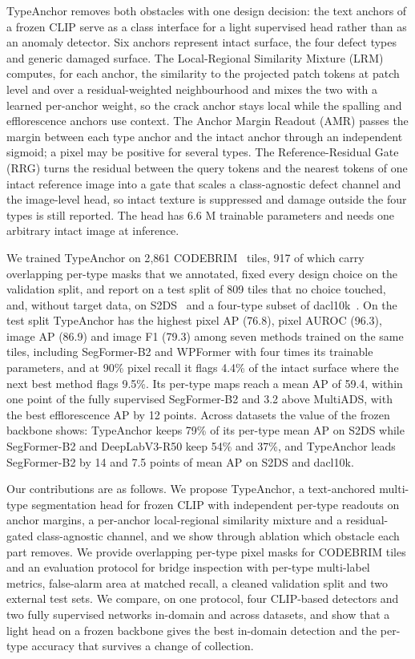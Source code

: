 \documentclass[conference]{IEEEtran}
\newcommand{\ours}{TypeAnchor}
\begin{document}
\ours{} removes both obstacles with one design decision: the text anchors of a frozen CLIP serve as a class interface for a light supervised head rather than as an anomaly detector. Six anchors represent intact surface, the four defect types and generic damaged surface. The Local-Regional Similarity Mixture (LRM) computes, for each anchor, the similarity to the projected patch tokens at patch level and over a residual-weighted neighbourhood and mixes the two with a learned per-anchor weight, so the crack anchor stays local while the spalling and efflorescence anchors use context. The Anchor Margin Readout (AMR) passes the margin between each type anchor and the intact anchor through an independent sigmoid; a pixel may be positive for several types. The Reference-Residual Gate (RRG) turns the residual between the query tokens and the nearest tokens of one intact reference image into a gate that scales a class-agnostic defect channel and the image-level head, so intact texture is suppressed and damage outside the four types is still reported. The head has 6.6 M trainable parameters and needs one arbitrary intact image at inference.

We trained \ours{} on 2{,}861 CODEBRIM~\cite{codebrim} tiles, 917 of which carry overlapping per-type masks that we annotated, fixed every design choice on the validation split, and report on a test split of 809 tiles that no choice touched, and, without target data, on S2DS~\cite{s2ds} and a four-type subset of dacl10k~\cite{dacl10k}. On the test split \ours{} has the highest pixel AP (76.8), pixel AUROC (96.3), image AP (86.9) and image F1 (79.3) among seven methods trained on the same tiles, including SegFormer-B2 and WPFormer with four times its trainable parameters, and at 90\% pixel recall it flags 4.4\% of the intact surface where the next best method flags 9.5\%. Its per-type maps reach a mean AP of 59.4, within one point of the fully supervised SegFormer-B2 and 3.2 above MultiADS, with the best efflorescence AP by 12 points. Across datasets the value of the frozen backbone shows: \ours{} keeps 79\% of its per-type mean AP on S2DS while SegFormer-B2 and DeepLabV3-R50 keep 54\% and 37\%, and \ours{} leads SegFormer-B2 by 14 and 7.5 points of mean AP on S2DS and dacl10k.

Our contributions are as follows. We propose \ours{}, a text-anchored multi-type segmentation head for frozen CLIP with independent per-type readouts on anchor margins, a per-anchor local-regional similarity mixture and a residual-gated class-agnostic channel, and we show through ablation which obstacle each part removes. We provide overlapping per-type pixel masks for CODEBRIM tiles and an evaluation protocol for bridge inspection with per-type multi-label metrics, false-alarm area at matched recall, a cleaned validation split and two external test sets. We compare, on one protocol, four CLIP-based detectors and two fully supervised networks in-domain and across datasets, and show that a light head on a frozen backbone gives the best in-domain detection and the per-type accuracy that survives a change of collection.
\end{document}

